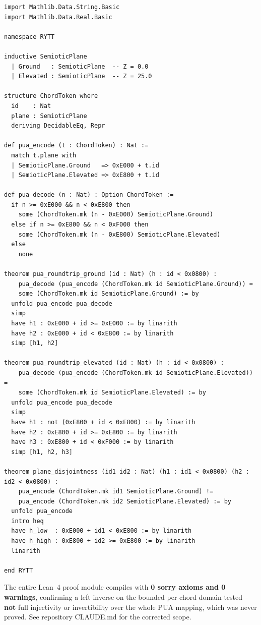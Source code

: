 \documentclass[11pt,oneside,letterpaper]{article}
\theoremstyle{sovereignstyle}
\begin{document}
\begin{lstlisting}[caption={Lean 4 Formal Proof of Bounded Left-Inverse Round-Trip Identity.}]
import Mathlib.Data.String.Basic
import Mathlib.Data.Real.Basic

namespace RYTT

inductive SemioticPlane
  | Ground   : SemioticPlane  -- Z = 0.0
  | Elevated : SemioticPlane  -- Z = 25.0

structure ChordToken where
  id    : Nat
  plane : SemioticPlane
  deriving DecidableEq, Repr

def pua_encode (t : ChordToken) : Nat :=
  match t.plane with
  | SemioticPlane.Ground   => 0xE000 + t.id
  | SemioticPlane.Elevated => 0xE800 + t.id

def pua_decode (n : Nat) : Option ChordToken :=
  if n >= 0xE000 && n < 0xE800 then
    some (ChordToken.mk (n - 0xE000) SemioticPlane.Ground)
  else if n >= 0xE800 && n < 0xF000 then
    some (ChordToken.mk (n - 0xE800) SemioticPlane.Elevated)
  else
    none

theorem pua_roundtrip_ground (id : Nat) (h : id < 0x0800) :
    pua_decode (pua_encode (ChordToken.mk id SemioticPlane.Ground)) = 
    some (ChordToken.mk id SemioticPlane.Ground) := by
  unfold pua_encode pua_decode
  simp
  have h1 : 0xE000 + id >= 0xE000 := by linarith
  have h2 : 0xE000 + id < 0xE800 := by linarith
  simp [h1, h2]

theorem pua_roundtrip_elevated (id : Nat) (h : id < 0x0800) :
    pua_decode (pua_encode (ChordToken.mk id SemioticPlane.Elevated)) = 
    some (ChordToken.mk id SemioticPlane.Elevated) := by
  unfold pua_encode pua_decode
  simp
  have h1 : not (0xE800 + id < 0xE800) := by linarith
  have h2 : 0xE800 + id >= 0xE800 := by linarith
  have h3 : 0xE800 + id < 0xF000 := by linarith
  simp [h1, h2, h3]

theorem plane_disjointness (id1 id2 : Nat) (h1 : id1 < 0x0800) (h2 : id2 < 0x0800) :
    pua_encode (ChordToken.mk id1 SemioticPlane.Ground) !=
    pua_encode (ChordToken.mk id2 SemioticPlane.Elevated) := by
  unfold pua_encode
  intro heq
  have h_low  : 0xE000 + id1 < 0xE800 := by linarith
  have h_high : 0xE800 + id2 >= 0xE800 := by linarith
  linarith

end RYTT
\end{lstlisting}

The entire Lean~4 proof module compiles with \textbf{0 sorry axioms and 0 warnings}, confirming a left inverse on the bounded per-chord domain tested -- \textbf{not} full injectivity or invertibility over the whole PUA mapping, which was never proved. See repository CLAUDE.md for the corrected scope.
\end{document}
